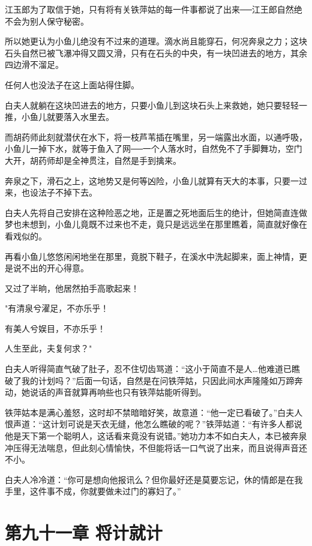 \documentclass[12pt,oneside]{book}
\begin{document}
江玉郎为了取信于她，只有将有关铁萍姑的每一件事都说了出来──江王郎自然绝不会为别人保守秘密。

所以她更认为小鱼儿绝没有不过来的道理。滴水尚且能穿石，何况奔泉之力；这块石头自然已被飞瀑冲得又圆又滑，只有在石头的中央，有一块凹进去的地方，其余四边滑不溜足。

任何人也没法子在这上面站得住脚。

白夫人就躺在这块凹进去的地方，只要小鱼儿到这块石头上来救她，她只要轻轻一推，小鱼儿就要落入水里去。

而胡药师此刻就潜伏在水下，将一枝芦苇插在嘴里，另一端露出水面，以通呼吸，小鱼儿一掉下水，就等于鱼入了网──一个人落水时，自然免不了手脚舞功，空门大开，胡药师却是全神贯注，自然是手到擒来。

奔泉之下，滑石之上，这地势又是何等凶险，小鱼儿就算有天大的本事，只要一过来，也设法子不掉下去。

白夫人先将自己安排在这种险恶之地，正是置之死地面后生的绝计，但她简直连做梦也未想到，小鱼儿竟既不过来也不走，竟只是远远坐在那里瞧着，简直就好像在看戏似的。

再看小鱼儿悠悠闲闲地坐在那里，竟脱下鞋子，在溪水中洗起脚来，面上神情，更是说不出的开心得意。

又过了半晌，他居然拍手高歌起来！

"有清泉兮濯足，不亦乐乎！

有美人兮娱目，不亦乐乎！

人生至此，夫复何求？"

白夫人听得简直气破了肚子，忍不住切齿骂道：``这小于简直不是人\ldots 他难道已瞧破了我的计划吗？''后面一句话，自然是在问铁萍姑，只因此间水声隆隆如万蹄奔动，她说话的声音就算再响些也只有铁萍姑能听得到。

铁萍姑本是满心羞怒，这时却不禁暗暗好笑，故意道：``他一定已看破了。''白夫人恨声道：``这计划可说是天衣无缝，他怎么瞧破的呢？''铁萍姑道：``有许多人都说他是天下第一个聪明人，这话看来竟没有说错。''她功力本不如白夫人，本已被奔泉冲压得无法喘息，但此刻心情愉快，不但能将话一口气说了出来，而且说得声音还不小。

白夫人冷冷道：``你可是想向他报讯么？但你最好还是莫要忘记，休的情郎是在我手里，这件事不成，你就要做未过门的寡妇了。''

\hypertarget{ux7b2cux4e5dux5341ux4e00ux7ae0-ux5c06ux8ba1ux5c31ux8ba1}{%
\chapter{第九十一章
将计就计}\label{ux7b2cux4e5dux5341ux4e00ux7ae0-ux5c06ux8ba1ux5c31ux8ba1}}
\end{document}
